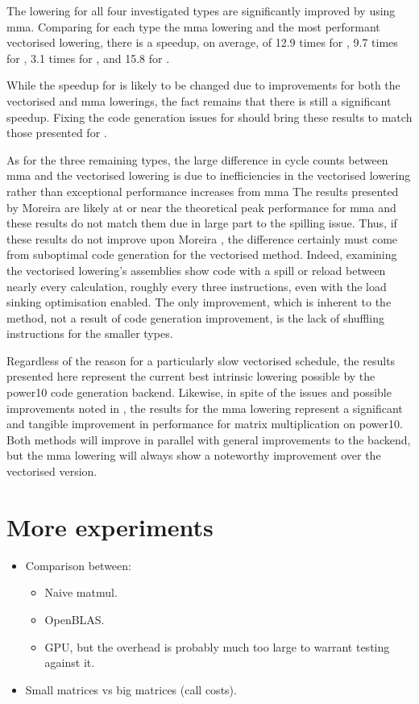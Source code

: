 \documentclass[\main/thesis.tex]{subfiles}
\begin{document}
The lowering for all four investigated types are significantly improved by using \gls{mma}.
Comparing for each type the \gls{mma} lowering and the most performant vectorised lowering, there is a speedup, on average, of 12.9 times for , 9.7 times for , 3.1 times for , and 15.8 for .

While the speedup for  is likely to be changed due to improvements for both the vectorised and \gls{mma} lowerings, the fact remains that there is still a significant speedup.
Fixing the code generation issues for  should bring these results to match those presented for .

As for the three remaining types, the large difference in cycle counts between \gls{mma} and the vectorised lowering is due to inefficiencies in the vectorised lowering rather than exceptional performance increases from \gls{mma}
The results presented by Moreira \etal are likely at or near the theoretical peak performance for \gls{mma} and these results do not match them due in large part to the spilling issue.
Thus, if these results do not improve upon Moreira \etal, the difference certainly must come from suboptimal code generation for the vectorised method.
Indeed, examining the vectorised lowering's assemblies show code with a spill or reload between nearly every calculation, roughly every three instructions, even with the load sinking optimisation enabled.
The only improvement, which is inherent to the method, not a result of code generation improvement, is the lack of shuffling instructions for the smaller types.

Regardless of the reason for a particularly slow vectorised schedule, the results presented here represent the current best intrinsic lowering possible by the \gls{power10} code generation backend.
Likewise, in spite of the issues and possible improvements noted in , the results for the \gls{mma} lowering represent a significant and tangible improvement in performance for matrix multiplication on \gls{power10}.
Both methods will improve in parallel with general improvements to the backend, but the \gls{mma} lowering will always show a noteworthy improvement over the vectorised version.

\section{More experiments}
\begin{itemize}
  \item Comparison between:
  \begin{itemize}
    \item Naive matmul.
    \item OpenBLAS.
    \item GPU, but the overhead is probably much too large to warrant testing against it.
  \end{itemize}
\end{itemize}

\begin{itemize}
  \item Small matrices vs big matrices (call costs).
\end{itemize}
\end{document}
